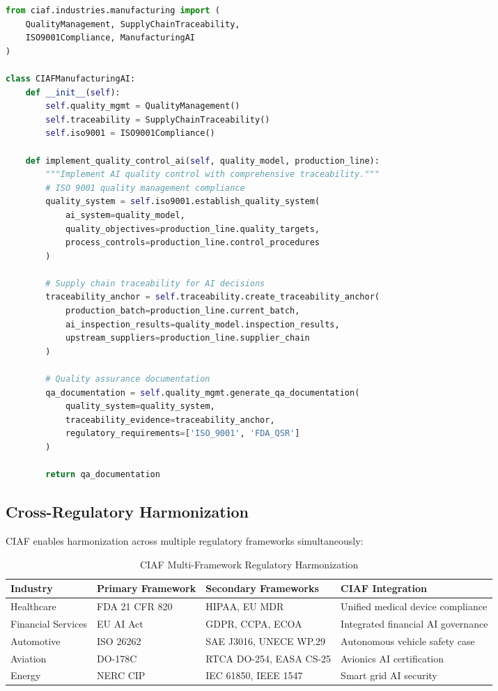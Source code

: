 \documentclass[12pt,a4paper]{article}
\begin{document}
\begin{lstlisting}[language=Python, caption=Supply Chain AI Implementation]
from ciaf.industries.manufacturing import (
    QualityManagement, SupplyChainTraceability, 
    ISO9001Compliance, ManufacturingAI
)

class CIAFManufacturingAI:
    def __init__(self):
        self.quality_mgmt = QualityManagement()
        self.traceability = SupplyChainTraceability()
        self.iso9001 = ISO9001Compliance()
    
    def implement_quality_control_ai(self, quality_model, production_line):
        """Implement AI quality control with comprehensive traceability."""
        # ISO 9001 quality management compliance
        quality_system = self.iso9001.establish_quality_system(
            ai_system=quality_model,
            quality_objectives=production_line.quality_targets,
            process_controls=production_line.control_procedures
        )
        
        # Supply chain traceability for AI decisions
        traceability_anchor = self.traceability.create_traceability_anchor(
            production_batch=production_line.current_batch,
            ai_inspection_results=quality_model.inspection_results,
            upstream_suppliers=production_line.supplier_chain
        )
        
        # Quality assurance documentation
        qa_documentation = self.quality_mgmt.generate_qa_documentation(
            quality_system=quality_system,
            traceability_evidence=traceability_anchor,
            regulatory_requirements=['ISO_9001', 'FDA_QSR']
        )
        
        return qa_documentation
\end{lstlisting}

\subsection{Cross-Regulatory Harmonization}

CIAF enables harmonization across multiple regulatory frameworks simultaneously:

\begin{table}[H]
\centering
\small
\begin{tabular}{|p{3cm}|p{3cm}|p{3cm}|p{4cm}|}
\hline
\textbf{Industry} & \textbf{Primary Framework} & \textbf{Secondary Frameworks} & \textbf{CIAF Integration} \\
\hline
Healthcare & FDA 21 CFR 820 & HIPAA, EU MDR & Unified medical device compliance \\
\hline
Financial Services & EU AI Act & GDPR, CCPA, ECOA & Integrated financial AI governance \\
\hline
Automotive & ISO 26262 & SAE J3016, UNECE WP.29 & Autonomous vehicle safety case \\
\hline
Aviation & DO-178C & RTCA DO-254, EASA CS-25 & Avionics AI certification \\
\hline
Energy & NERC CIP & IEC 61850, IEEE 1547 & Smart grid AI security \\
\hline
\end{tabular}
\caption{CIAF Multi-Framework Regulatory Harmonization}
\end{table}
\end{document}
